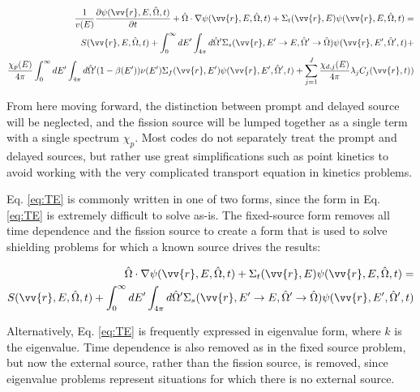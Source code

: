 \documentclass[10pt]{article}
\begin{document}
\begin{flushleft}
\begin{equation}
\label{eq:TE}
\begin{aligned}
\frac{1}{v(E)} \frac{\partial\psi(\vv{r}, E, \hat{\Omega},t)}{\partial t} +
 \hat{\Omega}\cdot\nabla\psi(\vv{r}, E, \hat{\Omega},t) + 
 \Sigma_t(\vv{r},E)\psi(\vv{r}, E, \hat{\Omega},t) = \\
S(\vv{r}, E, \hat{\Omega},t) + \int_{0}^{\infty}dE' \int_{4\pi}^{ } d\hat{\Omega}' \Sigma_s(\vv{r}, E'\rightarrow E, \hat{\Omega}'\rightarrow\hat{\Omega})\psi(\vv{r}, E', \hat{\Omega}',t) + \\
 \frac{\chi_p(E)}{4\pi} \int_{0}^{\infty} dE'\int_{4\pi}^{} d\hat{\Omega}'(1-\beta(E'))\nu(E')\Sigma_f(\vv{r}, E')\psi(\vv{r}, E', \hat{\Omega}',t) + 
 \sum_{j = 1}^{J} \frac{\chi_{d,j}(E)}{4\pi} \lambda_j C_j(\vv{r}, t))
\end{aligned}
\end{equation}

From here moving forward, the distinction between prompt and delayed source will be neglected, and the fission source will be lumped together as a single term with a single spectrum \(\chi_p\). Most codes do not separately treat the prompt and delayed sources, but rather use great simplifications such as point kinetics to avoid working with the very complicated transport equation in kinetics problems. 

Eq. \eqref{eq:TE} is commonly written in one of two forms, since the form in Eq. \eqref{eq:TE} is extremely difficult to solve as-is. The fixed-source form removes all time dependence and the fission source to create a form that is used to solve shielding problems for which a known source drives the results:

\begin{equation}
\label{eq:TE_fixedsource}
\begin{aligned}
 \hat{\Omega}\cdot\nabla\psi(\vv{r}, E, \hat{\Omega},t) + 
 \Sigma_t(\vv{r},E)\psi(\vv{r}, E, \hat{\Omega},t) = \\
S(\vv{r}, E, \hat{\Omega},t) + \int_{0}^{\infty}dE' \int_{4\pi}^{ } d\hat{\Omega}' \Sigma_s(\vv{r}, E'\rightarrow E, \hat{\Omega}'\rightarrow\hat{\Omega})\psi(\vv{r}, E', \hat{\Omega}',t)\\
\end{aligned}
\end{equation}

Alternatively, Eq. \eqref{eq:TE} is frequently expressed in eigenvalue form, where \(k\) is the eigenvalue. Time dependence is also removed as in the fixed source problem, but now the external source, rather than the fission source, is removed, since eigenvalue problems represent situations for which there is no external source.


\end{flushleft}
\end{document}
